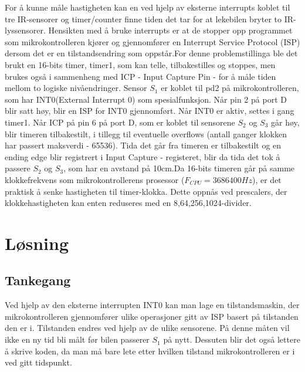 \documentclass[11pt, a4paper]{article}
\begin{document}
For å kunne måle hastigheten kan en ved hjelp av eksterne interrupts koblet til tre IR-sensorer og timer/counter finne tiden det tar for at lekebilen bryter to IR-lyssensorer.
Hensikten med å bruke interrupts er at de stopper opp programmet som mikrokontrolleren kjører og gjennomfører en Interrupt Service Protocol (ISP) dersom det er en tilstandsendring som oppstår.\newline For denne problemstillinga ble det brukt en 16-bits timer, timer1, som kan telle, tilbakestilles og stoppes, men brukes også i sammenheng med ICP - Input Capture Pin - for å måle tiden mellom to logiske nivåendringer. 
Sensor $S_{1}$ er koblet til pd2 på mikrokontrolleren, som har INT0(External Interrupt 0) som spesialfunksjon. Når pin 2 på port D blir satt høy, blir en ISP for INT0 gjennomført. Når INT0 er aktiv, settes i gang timer1. Når ICP på pin 6 på port D, som er koblet til sensorene $S_{2}$ og $S_{3}$ går høy, blir timeren tilbakestilt, i tillegg til eventuelle overflows (antall ganger klokken har passert maksverdi - 65536). Tida det går fra timeren er tilbakestilt og en ending edge blir registrert i Input Capture - registeret, blir da tida det tok å passere $S_{2}$ og $S_{3}$, som har en avstand på 10cm.\newline Da 16-bits timeren går på samme klokkefrekvens som mikrokontrollerens prosessor ($F_{CPU} = 3686400 Hz$), er det praktisk å senke hastigheten til timer-klokka. Dette oppnås ved prescalers, der klokkehastigheten kan enten reduseres med en 8,64,256,1024-divider. 


\section{Løsning}
\subsection{Tankegang}
Ved hjelp av den eksterne interrupten INT0 kan man lage en tilstandsmaskin, der mikrokontrolleren gjennomfører ulike operasjoner gitt av ISP basert på tilstanden den er i. Tilstanden endres ved hjelp av de ulike sensorene. På denne måten vil ikke en ny tid bli målt før bilen passerer $S_{1}$ på nytt. Dessuten blir det også lettere å skrive koden, da man må bare lete etter hvilken tilstand mikrokontrolleren er i ved gitt tidspunkt. 
\end{document}
